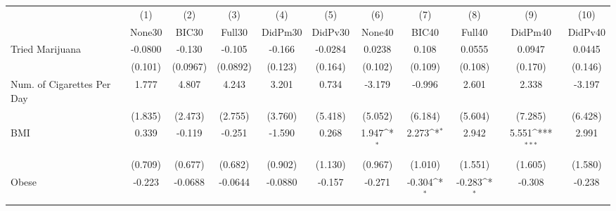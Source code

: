 {
\def\sym#1{\ifmmode^{#1}\else\(^{#1}\)\fi}
\begin{tabular}{l*{10}{c}}
\toprule
            &\multicolumn{1}{c}{(1)}&\multicolumn{1}{c}{(2)}&\multicolumn{1}{c}{(3)}&\multicolumn{1}{c}{(4)}&\multicolumn{1}{c}{(5)}&\multicolumn{1}{c}{(6)}&\multicolumn{1}{c}{(7)}&\multicolumn{1}{c}{(8)}&\multicolumn{1}{c}{(9)}&\multicolumn{1}{c}{(10)}\\
            &\multicolumn{1}{c}{None30}&\multicolumn{1}{c}{BIC30}&\multicolumn{1}{c}{Full30}&\multicolumn{1}{c}{DidPm30}&\multicolumn{1}{c}{DidPv30}&\multicolumn{1}{c}{None40}&\multicolumn{1}{c}{BIC40}&\multicolumn{1}{c}{Full40}&\multicolumn{1}{c}{DidPm40}&\multicolumn{1}{c}{DidPv40}\\
\midrule
Tried Marijuana&     -0.0800         &      -0.130         &      -0.105         &      -0.166         &     -0.0284         &      0.0238         &       0.108         &      0.0555         &      0.0947         &      0.0445         \\
            &     (0.101)         &    (0.0967)         &    (0.0892)         &     (0.123)         &     (0.164)         &     (0.102)         &     (0.109)         &     (0.108)         &     (0.170)         &     (0.146)         \\
\addlinespace
Num. of Cigarettes Per Day&       1.777         &       4.807         &       4.243         &       3.201         &       0.734         &      -3.179         &      -0.996         &       2.601         &       2.338         &      -3.197         \\
            &     (1.835)         &     (2.473)         &     (2.755)         &     (3.760)         &     (5.418)         &     (5.052)         &     (6.184)         &     (5.604)         &     (7.285)         &     (6.428)         \\
\addlinespace
BMI         &       0.339         &      -0.119         &      -0.251         &      -1.590         &       0.268         &       1.947\sym{*}  &       2.273\sym{*}  &       2.942         &       5.551\sym{***}&       2.991         \\
            &     (0.709)         &     (0.677)         &     (0.682)         &     (0.902)         &     (1.130)         &     (0.967)         &     (1.010)         &     (1.551)         &     (1.605)         &     (1.580)         \\
\addlinespace
Obese       &      -0.223         &     -0.0688         &     -0.0644         &     -0.0880         &      -0.157         &      -0.271         &      -0.304\sym{*}  &      -0.283\sym{*}  &      -0.308         &      -0.238         \\

\end{tabular}}
